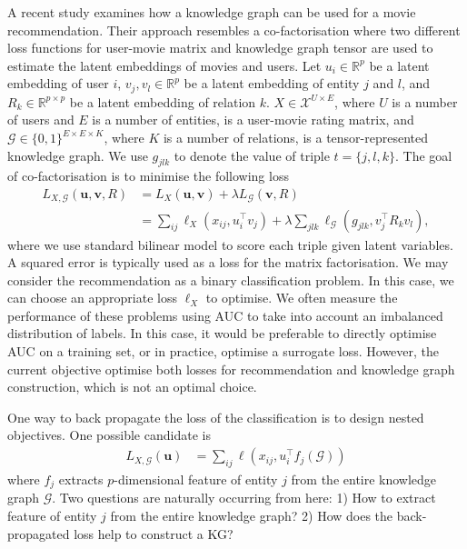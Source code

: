 \documentclass{article} %
\theoremstyle{definition}
\begin{document}
A recent study \cite{Zhang2016} examines how a knowledge graph can be used for a movie recommendation. Their approach resembles a co-factorisation where two different loss functions for user-movie matrix and knowledge graph tensor are used to estimate the latent embeddings of movies and users.
Let $u_i \in \mathbb{R}^p$ be a latent embedding of user $i$, $v_j, v_l \in \mathbb{R}^p$ be a latent embedding of entity $j$ and $l$, and $R_k \in \mathbb{R}^{p\times p}$ be a latent embedding of relation $k$. $X \in \mathcal{X}^{U \times E}$, where $U$ is a number of users and $E$ is a number of entities, is a user-movie rating matrix, and $\mathcal{G} \in \{0,1\}^{E\times E \times K}$, where $K$ is a number of relations, is a tensor-represented knowledge graph. We use $g_{jlk}$ to denote the value of triple $t=\{j, l, k\}$. The goal of co-factorisation is to minimise the following loss
\begin{align}
L_{X, \mathcal{G}}(\mathbf{u}, \mathbf{v}, R) & = L_X(\mathbf{u}, \mathbf{v}) + \lambda L_\mathcal{G}(\mathbf{v}, R)\\
& = \sum_{ij}\ell_X(x_{ij}, u_{i}^\top v_j) + \lambda \sum_{jlk}\ell_\mathcal{G}(g_{jlk}, v_j^\top R_k v_{l}), \label{eqn:two_losses}
\end{align}
where we use standard bilinear model to score each triple given latent variables.
A squared error is typically used as a loss for the matrix factorisation. We may consider the recommendation as a binary classification problem. In this case, we can choose an appropriate loss $\ell_X$ to optimise.  We often measure the performance of these problems using AUC to take into account an imbalanced distribution of labels. In this case, it would be preferable to directly optimise AUC on a training set, or in practice, optimise a surrogate loss. However, the current objective optimise both losses for recommendation and knowledge graph construction, which is not an optimal choice.

One way to back propagate the loss of the classification is to design nested objectives. One possible candidate is
\begin{align}
\label{eqn:obj}
L_{X, \mathcal{G}}(\mathbf{u}) & = \sum_{ij}\ell(x_{ij}, u_{i}^\top f_j(\mathcal{G}))
\end{align}
where $f_j$ extracts $p$-dimensional feature of entity $j$ from the entire knowledge graph $\mathcal{G}$. Two questions are naturally occurring from here: 1) How to extract feature of entity $j$ from the entire knowledge graph? 2) How does the back-propagated loss help to construct a KG?
\end{document}

